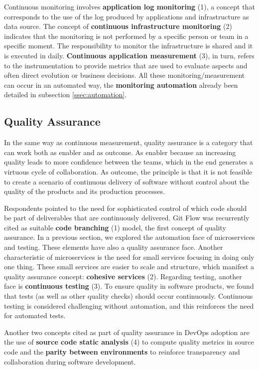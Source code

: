 Continuous monitoring involves \textbf{application log monitoring} (1), a
concept that corresponds to the use of the log produced by
applications and infrastructure as data source. The concept of
\textbf{continuous infrastructure monitoring} (2) indicates that the monitoring
is not performed by a specific person or team in a specific moment. The
responsibility to monitor the infrastructure is shared and it is executed in
daily. \textbf{Continuous application measurement} (3), in turn, refers to
the instrumentation to provide metrics that are used to evaluate aspects and
often direct evolution or business decisions. All these monitoring/measurement
can occur in an automated way, the \textbf{monitoring automation} already been
detailed in subsection \ref{ssec:automation}.

\subsection{Quality Assurance}

In the same way as continuous measurement, quality assurance is a category that
can work both as enabler and as outcome. As enabler because an increasing quality
leads to more confidence between the teams, which in the end generates a virtuous
cycle of collaboration. As outcome, the principle is that it is not
feasible to create a scenario of continuous delivery of software without control
about the quality of the products and its production processes.

Respondents pointed to the need for sophisticated control of which code should
be part of deliverables that are continuously delivered. Git Flow was
recurrently cited as suitable \textbf{code branching} (1) model, the first
concept of quality assurance.
In a previous section, we explored the automation face of
microservices and testing. These elements have also a quality assurance face.
Another characteristic of microservices is the need for small services focusing
in doing only one thing. These small services are easier to scale and
structure, which manifest a quality assurance concept: \textbf{cohesive
services} (2). Regarding testing, another face is \textbf{continuous
testing} (3). To ensure quality in software products, we found that
tests (as well as other quality checks) should occur continuously. Continuous testing
is considered challenging without automation, and this reinforces the need for automated
tests.

Another two concepts cited as part of quality assurance in DevOps adoption are
the use of \textbf{source code static analysis} (4) to compute quality metrics in
source code and the \textbf{parity between environments} to
reinforce transparency and collaboration during software development.
